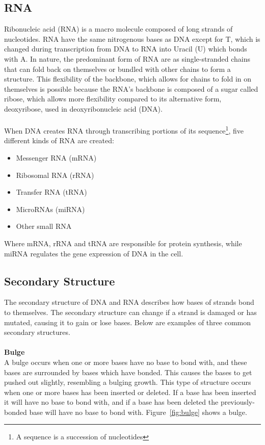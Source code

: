 \subsection{RNA}
Ribonucleic acid (RNA) is a macro molecule composed of long strands of 
nucleotides. RNA have the same nitrogenous bases as DNA except for T, which is 
changed during transcription from DNA to RNA into Uracil (U) which bonds with 
A. In nature, the predominant form of RNA are as single-stranded chains that 
can fold back on themselves or bundled with other chains to form a structure. This 
flexibility of the backbone, which allows for chains to fold in on themselves is 
possible because the RNA's backbone is composed of a sugar called ribose, which 
allows more flexibility compared to its alternative form, deoxyribose, used in 
deoxyribonucleic acid (DNA).\\\\
When DNA creates RNA through transcribing portions of its sequence\footnote{A 
sequence is a succession of nucleotides}, five different kinds of RNA are 
created\cite[p. 236, table 7-1]{alberts}:
\begin{itemize}
\item Messenger RNA (mRNA)
\item Ribosomal RNA (rRNA)
\item Transfer RNA (tRNA)
\item MicroRNAs (miRNA)
\item Other small RNA
\end{itemize}
Where mRNA, rRNA and tRNA are responsible for protein synthesis, while miRNA 
regulates the gene expression of DNA in the cell.
\subsection{Secondary Structure}\label{structs}
The secondary structure of DNA and RNA describes how bases of 
strands bond to themselves. The secondary structure can change if 
a strand is damaged or has mutated, causing it to gain or lose 
bases. Below are examples of three common secondary structures.\\\\
\textbf{Bulge}\\ 
A bulge occurs when one or more bases have no base to bond with, and these 
bases are surrounded by bases which have bonded. This causes the bases to get 
pushed out slightly, resembling a bulging growth. This type of structure occurs 
when one or more bases has been inserted or deleted. If a base has been 
inserted it will have no base to bond with, and if a base has been deleted 
the previously-bonded base will have no base to bond with. Figure~\ref{fig:bulge} shows a bulge.

